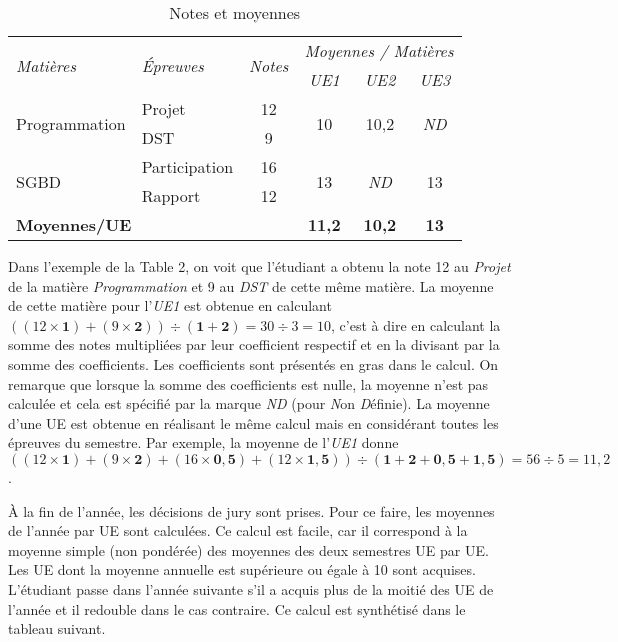 \documentclass[10pt,a4paper,oneside]{article}
\begin{document}
\begin{table}[h]
	\centering
	\begin{tabular}{|l|l|c|c|c|c|} \hline
		 \multirow{2}{*}{\textit{Matières}} & \multirow{2}{*}{\textit{\'Epreuves}} & \multirow{2}{*}{\textit{Notes}} & \multicolumn{3}{c|}{\textit{Moyennes / Matières}} \\ \cline{4-6}
		  &  &  & \textit{UE1} & \textit{UE2} & \textit{UE3} \\ \hline\hline
		\multirow{2}{*}{Programmation} & Projet & 12 & \multirow{2}{*}{10} & \multirow{2}{*}{10,2} & \multirow{2}{*}{\textit{ND}} \\ \cline{2-3}
		 & DST & 9 &  &  &  \\ \hline
		 \multirow{2}{*}{SGBD} 	& Participation & 16 & \multirow{2}{*}{13} & \multirow{2}{*}{\textit{ND}} & \multirow{2}{*}{13} \\ \cline{2-3}
		 & Rapport & 12 &  &  &  \\ \hline \hline
		\multicolumn{3}{|l|}{\textbf{Moyennes/UE}} & \textbf{11,2} & \textbf{10,2} & \textbf{13} \\ \hline
	\end{tabular}
	\caption{Notes et moyennes}
	\label{tab:NotesEtMoyennes}
\end{table}

Dans l'exemple de la Table 2, on voit que l'étudiant a obtenu la note 12 au \textit{Projet} de la matière \textit{Programmation} et 9 au \textit{DST} de cette même matière. La moyenne de cette matière pour l'\textit{UE1} est obtenue en calculant $((12 \times \mathbf{1}) + (9 \times \mathbf{2})) \div (\mathbf{1} + \mathbf{2}) = 30 \div 3 = 10$, c'est à dire en calculant la somme des notes multipliées par leur coefficient respectif et en la divisant par la somme des coefficients. Les coefficients sont présentés en gras dans le calcul. On remarque que lorsque la somme des coefficients est nulle, la moyenne n'est pas calculée et cela est spécifié par la marque \textit{ND} (pour \textit{N}on \textit{D}éfinie). La moyenne d'une UE est obtenue en réalisant le même calcul mais en considérant toutes les épreuves du semestre. Par exemple, la moyenne de l'\textit{UE1} donne $((12 \times \mathbf{1}) + (9 \times \mathbf{2}) + (16 \times \mathbf{0,5}) + (12 \times \mathbf{1,5})) \div (\mathbf{1} + \mathbf{2} + \mathbf{0,5} + \mathbf{1,5}) = 56 \div 5 = 11,2$.

\medskip

\`A la fin de l'année, les décisions de jury sont prises. Pour ce faire, les moyennes de l'année par UE sont calculées. Ce calcul est facile, car il correspond à la moyenne simple (non pondérée) des moyennes des deux semestres UE par UE. Les UE dont la moyenne annuelle est supérieure ou égale à 10 sont acquises. L'étudiant passe dans l'année suivante s'il a acquis plus de la moitié des UE de l'année et il redouble dans le cas contraire. Ce calcul est synthétisé dans le tableau suivant.
\end{document}
